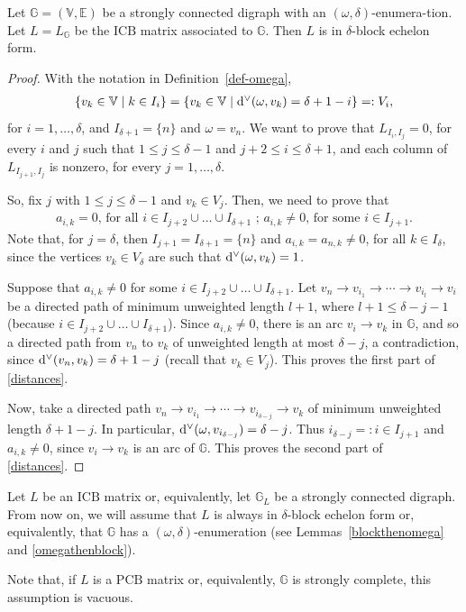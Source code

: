 \documentclass[ALCO]{cedram}
\newcommand{\mbg}{\mbox{$\mathbb{G}$}}
\newcommand{\mbv}{\mbox{$\mathbb{V}$}}
\newcommand{\mbe}{\mbox{$\mathbb{E}$}}
\newcommand{\icb}{\mbox{$\mathrm{ICB}$}}
\newcommand{\pcb}{\mbox{$\mathrm{PCB}$}}
\newcommand{\ud}{\mbox{${\rm d}^\vee$}}
\begin{document}
\begin{lemma}\label{omegathenblock}
Let $\mbg=(\mbv,\mbe)$ be a strongly connected digraph with an
$(\omega,\delta)$-enumera-tion. Let $L=L_{\mathbb{G}}$ be the $\icb$
matrix associated to $\mbg$. Then $L$ is in $\delta$-block echelon
form.
\end{lemma}
\begin{proof}
With the notation in Definition~\ref{def-omega}, 
\begin{eqnarray*}
\{v_k\in \mbv\mid
k\in I_i\}=\{v_k\in \mbv\mid \ud(\omega,v_k)=\delta+1-i\}=:V_i, 
\end{eqnarray*}
for $i=1,\ldots ,\delta$, and $I_{\delta+1}=\{n\}$ and $\omega=v_n$.
We want to prove that $L_{I_{i},I_{j}}=0$, for every $i$ and $j$ such
that $1\leq j\leq \delta-1$ and $j+2\leq i\leq \delta+1$, and each
column of $L_{I_{j+1},I_j}$ is nonzero, for every $j=1,\ldots
,\delta$.

So, fix $j$ with $1\leq j\leq \delta-1$ and $v_k\in V_j$. Then, we
need to prove that
\begin{eqnarray}\label{distances}
a_{i,k}=0\mbox{, for all }i\in I_{j+2}\cup\ldots \cup
  I_{\delta+1}\mbox{ ; } a_{i,k}\neq 0\mbox{, for some }i\in I_{j+1}.
\end{eqnarray}
Note that, for $j=\delta$, then $I_{j+1}=I_{\delta+1}=\{n\}$ and
$a_{i,k}=a_{n,k}\neq 0$, for all $k\in I_\delta$, since the vertices
$v_k\in V_\delta$ are such that $\ud(\omega,v_k)=1$.

Suppose that $a_{i,k}\neq 0$ for some $i\in I_{j+2}\cup\ldots \cup
I_{\delta+1}$. Let $v_n\to v_{i_1}\to \cdots \to v_{i_l}\to v_i$ be a
directed path of minimum unweighted length $l+1$, where $l+1\leq
\delta-j-1$ (because $i\in I_{j+2}\cup\ldots \cup
I_{\delta+1}$). Since $a_{i,k}\neq 0$, there is an arc $v_i\to v_k$ in
$\mbg$, and so a directed path from $v_n$ to $v_k$ of unweighted
length at most $\delta-j$, a contradiction, since
$\ud(v_n,v_k)=\delta+1-j$ (recall that $v_k\in V_j$). This proves the
first part of \eqref{distances}.

Now, take a directed path $v_n\to v_{i_1}\to \cdots \to
v_{i_{\delta-j}}\to v_k$ of minimum unweighted length
$\delta+1-j$. In particular, $\ud(\omega
,v_{i_{\delta-j}})=\delta-j$. Thus $i_{\delta-j}=:i\in I_{j+1}$ and
$a_{i,k}\neq 0$, since $v_i\to v_k$ is an arc of $\mbg$. This proves the
second part of \eqref{distances}.
\end{proof}

\begin{assumption}\label{echelon-omega}
Let $L$ be an $\icb$ matrix or, equivalently, let $\mbg_L$ be a
strongly connected digraph. From now on, we will assume that $L$ is
always in $\delta$-block echelon form or, equivalently, that $\mbg$
has a $(\omega,\delta)$-enumeration (see Lemmas~\ref{blockthenomega}
and \ref{omegathenblock}).

Note that, if $L$ is a $\pcb$ matrix or, equivalently, $\mbg$ is
strongly complete, this assumption is vacuous.
\end{assumption}
\end{document}
